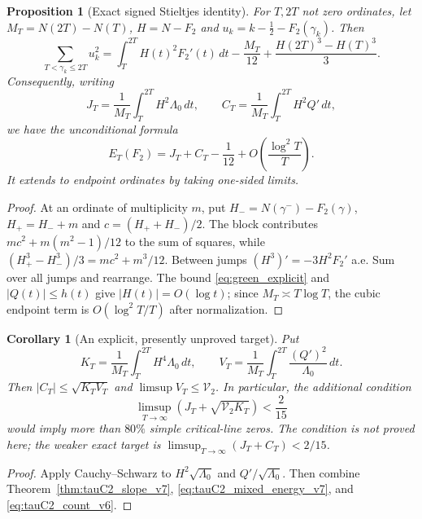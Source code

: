 \documentclass[11pt,reqno]{amsart}
\numberwithin{equation}{section}
\newtheorem{proposition}[theorem]{Proposition}
\newtheorem{corollary}[theorem]{Corollary}
\theoremstyle{definition}
\theoremstyle{remark}
\begin{document}
\begin{proposition}[Exact signed Stieltjes identity]
\label{prop:tauC2_exact_energy_v7}
For $T,2T$ not zero ordinates, let
$M_T=N(2T)-N(T)$, $H=N-F_2$ and
$u_k=k-\frac12-F_2(\gamma_k)$. Then
\begin{equation}
 \boxed{\displaystyle
 \sum_{T<\gamma_k\le2T}u_k^2=
 \int_T^{2T}H(t)^2F_2'(t)\,dt
 -\frac{M_T}{12}
 +\frac{H(2T)^3-H(T)^3}{3}.}
 \label{eq:tauC2_exact_energy_v7}
\end{equation}
Consequently, writing
\[
 J_T=\frac1{M_T}\int_T^{2T}H^2\Lambda_0\,dt,\qquad
 C_T=\frac1{M_T}\int_T^{2T}H^2Q'\,dt,
\]
we have the unconditional formula
\begin{equation}
 E_T(F_2)=J_T+C_T-\frac1{12}
 +O\!\left(\frac{\log^2T}{T}\right).
 \label{eq:tauC2_mixed_energy_v7}
\end{equation}
It extends to endpoint ordinates by taking one-sided limits.
\end{proposition}
\begin{proof}
At an ordinate of multiplicity $m$, put
$H_-=N(\gamma^-)-F_2(\gamma)$,
$H_+=H_-+m$ and $c=(H_++H_-)/2$.
The block contributes
$mc^2+m(m^2-1)/12$ to the sum of squares, while
$(H_+^3-H_-^3)/3=mc^2+m^3/12$.
Between jumps $(H^3)'=-3H^2F_2'$ a.e.
Sum over all jumps and rearrange.
The bound \eqref{eq:green_explicit} and $|Q(t)|\le h(t)$
give $|H(t)|=O(\log t)$; since $M_T\asymp T\log T$,
the cubic endpoint term is $O(\log^2T/T)$ after
normalization.
\end{proof}

\begin{corollary}[An explicit, presently unproved target]
\label{cor:tauC2_80_v7}
Put
\[
 K_T=\frac1{M_T}\int_T^{2T}H^4\Lambda_0\,dt,\qquad
 V_T=\frac1{M_T}\int_T^{2T}\frac{(Q')^2}{\Lambda_0}\,dt.
\]
Then $|C_T|\le\sqrt{K_TV_T}$ and
$\limsup V_T\le\mathcal V_2$.
In particular, the additional condition
\begin{equation}
 \boxed{\displaystyle
 \limsup_{T\to\infty}
 \left(J_T+\sqrt{\mathcal V_2 K_T}\right)<\frac2{15}}
 \label{eq:tauC2_80_target_v7}
\end{equation}
would imply more than $80\%$ simple critical-line zeros.
The condition is \emph{not proved here};
the weaker exact target is
$\limsup_{T\to\infty}(J_T+C_T)<2/15$.
\end{corollary}
\begin{proof}
Apply Cauchy--Schwarz to
$H^2\sqrt{\Lambda_0}$ and $Q'/\sqrt{\Lambda_0}$.
Then combine Theorem~\ref{thm:tauC2_slope_v7},
\eqref{eq:tauC2_mixed_energy_v7}, and
\eqref{eq:tauC2_count_v6}.
\end{proof}
\end{document}
